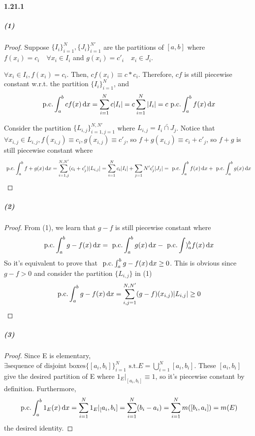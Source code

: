 \documentclass{article}
\begin{document}
\paragraph{1.21.1}
\subparagraph{(1)}
\begin{proof}
Suppose $\{I_i\}_{i=1}^N,\{J_i\}_{i=1}^{N'}$ are the partitions of $[a,b]$  where $f(x_i)=c_i\quad \forall x_i\in I_i$ and $g(x_i)=c'_i\quad x_i\in J_i$.

$\forall x_i\in I_i,f(x_i)=c_i$. Then, $cf(x_i)\equiv c*c_i$. Therefore, $cf$ is still piecewise constant w.r.t. the partition $\{I_i\}_{i=1}^{N}$, and 
\[\text{ p.c.} \int_a^b cf(x)\,\mathrm{d} x=\sum_{i=1}^{N}c|I_i|=c\sum_{i=1}^{N}|I_i|=c\text{ p.c.}\int_a^b f(x)\,\mathrm{d} x\]

Consider the partition $\{L_{i,j}\}_{i=1,j=1}^{N,N'}$ where $L_{i,j}=\bar{I_i \cap J_j}$. Notice that $\forall x_{i,j}\in L_{i,j}, f(x_{i,j})\equiv c_i,g(x_{i,j})\equiv c'_j$, so $f+g(x_{i,j})\equiv c_i+c'_j$, so $f+g$ is still piecewise constant where
\[\text{ p.c.}\int_a^b f+g(x)\,\mathrm{d} x=\sum_{i=1,j}^{N,N'}(c_i+c'_j)|L_{i,j}|=\sum_{i=1}^{N}c_i|I_i|+\sum_{j=1}{N'}c'_j|J_j|=\text{ p.c.}\int_a^b f(x)\,\mathrm{d} x+\text{ p.c.}\int_a^b g(x)\,\mathrm{d} x\]
\end{proof}
\subparagraph{(2)}
\begin{proof}
From (1), we learn that $g-f$ is still piecewise constant where
\[\text{ p.c.}\int_a^b g-f(x)\,\mathrm{d} x=\text{ p.c.}\int_a^b g(x)\,\mathrm{d} x-\text{ p.c.}\int)_a^b f(x)\,\mathrm{d} x\]
So it's equivalent to prove that $\text{ p.c.}\int_a^b g-f(x)\,\mathrm{d} x \geq 0$. This is obvious since $g-f>0$ and consider the partition $\{L_{i,j}\}$ in (1)
\[\text{ p.c.}\int_a^b g-f(x)\,\mathrm{d} x =\sum_{i,j=1}^{N,N'}(g-f)(x_{i,j})|L_{i,j}|\geq 0\]
\end{proof}
\subparagraph{(3)}
\begin{proof}
Since E is elementary, $\exists \text{sequence of disjoint boxes}\{[a_i,b_i]\}_{i=1}^{N}\text{ s.t.} E=\bigcup\limits_{i=1}^{N}[a_i,b_i]$. These $[a_i,b_i]$ give the desired partition of E where $1_E|_{[a_i,b_i]}\equiv 1$, so it's piecewise constant by definition. Furthermore,
\[\text{ p.c.}\int_a^b 1_{E}(x)\,\mathrm{d} x=\sum_{i=1}^{N}1_E|_[a_i,b_i]=\sum_{i=1}^{N}(b_i-a_i)=\sum_{i=1}^{N}m([b_i,a_i])=m(E)\]
the desired identity.
\end{proof}
\end{document}
